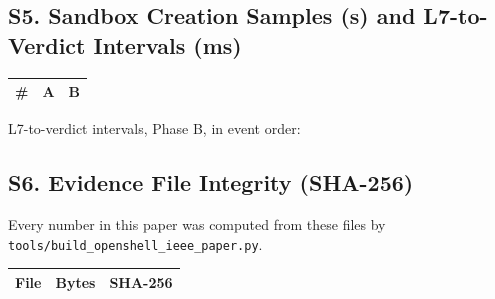 \documentclass[journal]{IEEEtran}
\begin{document}
\normalsize
\subsection*{S5. Sandbox Creation Samples (s) and L7-to-Verdict Intervals (ms)}
\begin{center}
\small
\begin{tabular}{rrr}
\toprule
\# & \textbf{A} & \textbf{B} \\
\midrule

\end{tabular}
\end{center}
L7-to-verdict intervals, Phase B, in event order: 

\subsection*{S6. Evidence File Integrity (SHA-256)}
Every number in this paper was computed from these files by \texttt{tools/build\_openshell\_ieee\_paper.py}.
\scriptsize
\begin{longtable}{lrl}
\toprule
\textbf{File} & \textbf{Bytes} & \textbf{SHA-256} \\
\midrule
\endhead

\end{longtable}
\end{document}
